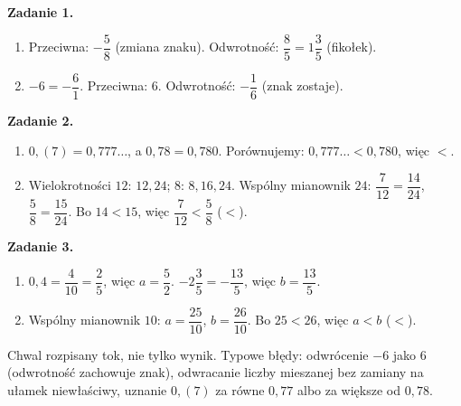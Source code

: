 \documentclass[11pt,a4paper]{article}
\begin{document}

\vspace{0.6em}
\textbf{Zadanie 1.}
\begin{enumerate}[label=\alph*), leftmargin=*, itemsep=4pt]
  \item Przeciwna: $-\dfrac{5}{8}$ (zmiana znaku). Odwrotność: $\dfrac{8}{5}=1\dfrac{3}{5}$ (fikołek).
  \item $-6=-\dfrac{6}{1}$. Przeciwna: $6$. Odwrotność: $-\dfrac{1}{6}$ (znak zostaje).
\end{enumerate}

\textbf{Zadanie 2.}
\begin{enumerate}[label=\alph*), leftmargin=*, itemsep=4pt]
  \item $0{,}(7)=0{,}777\ldots$, a $0{,}78=0{,}780$. Porównujemy: $0{,}777\ldots<0{,}780$, więc \textbf{$<$}.
  \item Wielokrotności $12$: $12, 24$; $8$: $8, 16, 24$. Wspólny mianownik $24$: $\dfrac{7}{12}=\dfrac{14}{24}$, $\dfrac{5}{8}=\dfrac{15}{24}$. Bo $14<15$, więc $\dfrac{7}{12}<\dfrac{5}{8}$ (\textbf{$<$}).
\end{enumerate}

\textbf{Zadanie 3.}
\begin{enumerate}[label=\alph*), leftmargin=*, itemsep=4pt]
  \item $0{,}4=\dfrac{4}{10}=\dfrac{2}{5}$, więc $a=\dfrac{5}{2}$. $-2\dfrac{3}{5}=-\dfrac{13}{5}$, więc $b=\dfrac{13}{5}$.
  \item Wspólny mianownik $10$: $a=\dfrac{25}{10}$, $b=\dfrac{26}{10}$. Bo $25<26$, więc $a<b$ (\textbf{$<$}).
\end{enumerate}

\vspace{0.6em}
\begin{tcolorbox}[colback=white, colframe=okres, boxrule=0.6pt, arc=2pt, title=Wskazówka dla Pawła]
Chwal rozpisany tok, nie tylko wynik. Typowe błędy: odwrócenie $-6$ jako $6$ (odwrotność zachowuje znak), odwracanie liczby mieszanej bez zamiany na ułamek niewłaściwy, uznanie $0{,}(7)$ za równe $0{,}77$ albo za większe od $0{,}78$.
\end{tcolorbox}
\end{document}
